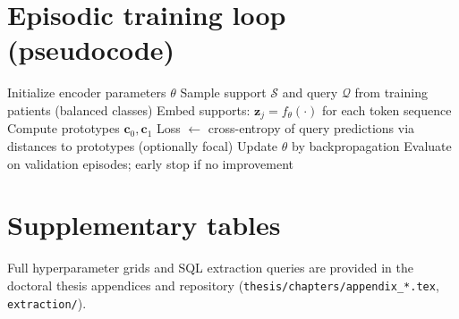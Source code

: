 \section{Episodic training loop (pseudocode)}
\label{app:algo}

\begin{algorithm}[htbp]
\caption{Episodic meta-training step (simplified)}
\label{alg:episodic}
\begin{algorithmic}[1]
\State Initialize encoder parameters $\theta$
    \State Sample support $\mathcal{S}$ and query $\mathcal{Q}$ from training patients (balanced classes)
    \State Embed supports: $\mathbf{z}_j = f_\theta(\cdot)$ for each token sequence
    \State Compute prototypes $\mathbf{c}_0, \mathbf{c}_1$
    \State Loss $\leftarrow$ cross-entropy of query predictions via distances to prototypes (optionally focal)
    \State Update $\theta$ by backpropagation
  \EndFor
  \State Evaluate on validation episodes; early stop if no improvement
\EndFor
\end{algorithmic}
\end{algorithm}

\section{Supplementary tables}
Full hyperparameter grids and SQL extraction queries are provided in the doctoral thesis appendices and repository (\texttt{thesis/chapters/appendix\_*.tex}, \texttt{extraction/}).
